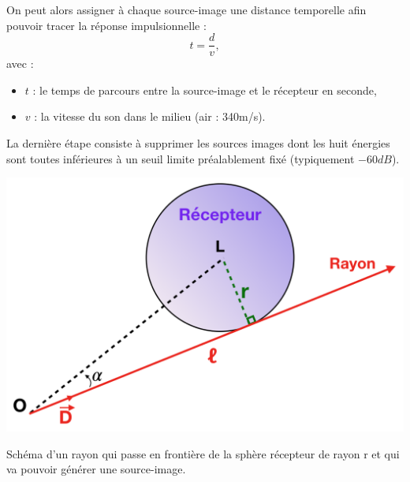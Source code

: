%
 On peut alors assigner à chaque source-image une distance temporelle afin pouvoir tracer la réponse impulsionnelle :
\begin{equation}
 t =  \frac{d}{v},
\end{equation}
avec : 
\begin{itemize}
\item$t$ : le temps de parcours entre la source-image et le récepteur en seconde,
\item$v$ : la vitesse du son dans le milieu (air : 340m/s).
\end{itemize}
La dernière étape consiste à supprimer les sources images dont les huit énergies sont toutes inférieures à un seuil limite préalablement fixé (typiquement $-60dB$).
%
\begin{figureth}
	\begin{subfigureth}{0.55\textwidth}
			\includegraphics[width=\linewidth]{images/touche}
			\caption{Schéma d'un rayon qui passe en frontière de la sphère récepteur de rayon r et qui va pouvoir générer une source-image.}
			\label{touche}
		\end{subfigureth}
		\qquad
		\begin{subfigureth}{0.35\textwidth}

\end{subfigureth}
\end{figureth}
